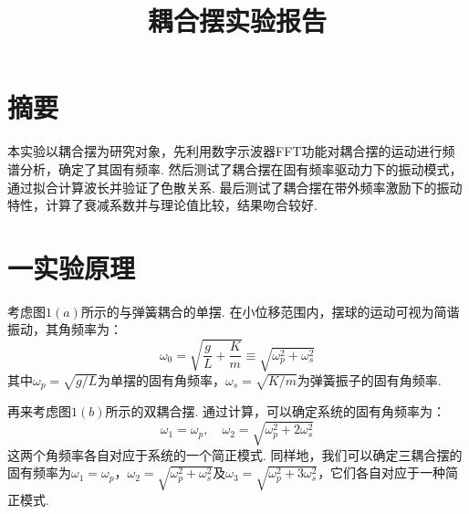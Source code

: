 \documentclass{ctexart}
\title{耦合摆实验报告}
\begin{document}
\maketitle

\section*{摘要}
本实验以耦合摆为研究对象，先利用数字示波器FFT功能对耦合摆的运动进行频谱分析，确定了其固有频率. 然后测试了耦合摆在固有频率驱动力下的振动模式，通过拟合计算波长并验证了色散关系. 最后测试了耦合摆在带外频率激励下的振动特性，计算了衰减系数并与理论值比较，结果吻合较好.
\section*{一\quad 实验原理}
考虑图$1(a)$所示的与弹簧耦合的单摆. 在小位移范围内，摆球的运动可视为简谐振动，其角频率为：
\begin{equation}
  \omega_0=\sqrt{\frac{g}{L}+\frac{K}{m}} \equiv \sqrt{\omega_p^2+\omega_s^2} \tag{1}
\end{equation}
其中$\omega_p=\sqrt{g/L}$为单摆的固有角频率，$\omega_s=\sqrt{K/m}$为弹簧振子的固有角频率.

再来考虑图$1(b)$所示的双耦合摆. 通过计算，可以确定系统的固有角频率为：
\begin{equation}
  \omega_1=\omega_p, \quad \omega_2=\sqrt{\omega_p^2+2\omega_s^2} \tag{2}
\end{equation}
这两个角频率各自对应于系统的一个简正模式. 同样地，我们可以确定三耦合摆的固有频率为$\omega_1=\omega_p$，$\omega_2=\sqrt{\omega_p^2+\omega_s^2}$及$\omega_3=\sqrt{\omega_p^2+3\omega_s^2}$，它们各自对应于一种简正模式.
\end{document}
